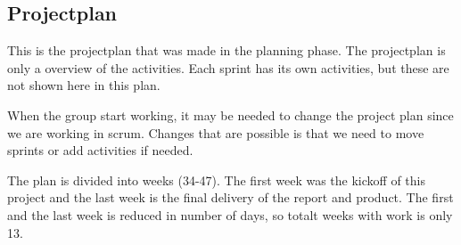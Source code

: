 \subsection{Projectplan}

	This is the projectplan that was made in the planning phase. The projectplan
	is only a overview of the activities. Each sprint has its own activities, but
	these are not shown here in this plan. 

	When the group start working, it may be needed to change the project plan since we
	are working in scrum. Changes that are possible is that we need to move sprints or
	add activities if needed. 

	The plan is divided into weeks (34-47). The first week was the kickoff of this project
	and the last week is the final delivery of the report and product.
	The first and the last week is reduced in number of days, so totalt weeks with work is
	only 13. \\

